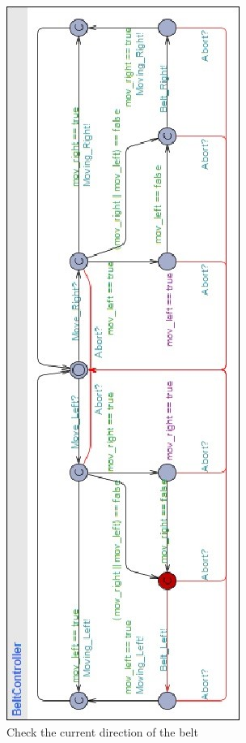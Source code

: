 \documentclass[a4paper,oneside,11pt]{report}
\begin{document}
\begin{figure}
\centering
\includegraphics[height=0.75\textheight]{images/BCTL2.jpg}
\caption{Check the current direction of the belt}
\label{fig:bctl2}
\end{figure}
\end{document}
